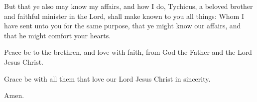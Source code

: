 \Verse But that ye also may know my affairs, and how I do, Tychicus, a beloved brother and faithful minister in the Lord, shall make known to you all things: \Verse Whom I have sent unto you for the same purpose, that ye might know our affairs, and that he might comfort your hearts.

\Verse Peace be to the brethren, and love with faith, from God the Father and the Lord Jesus Christ.

\Verse Grace be with all them that love our Lord Jesus Christ in sincerity.

Amen.


